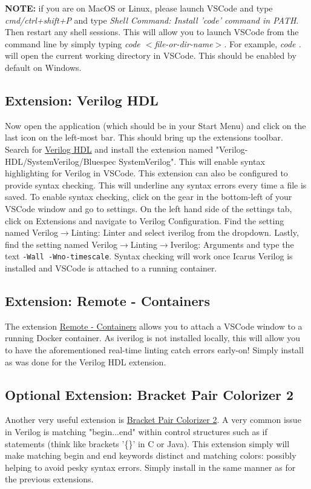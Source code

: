 \documentclass[11pt, letterpaper, titlepage, oneside]{memoir}
\begin{document}
        \textbf{NOTE:} if you are on MacOS or Linux, please launch VSCode and type \textit{cmd/ctrl+shift+P} and type \textit{Shell Command: Install 'code' command in PATH}. Then restart any shell sessions. This will allow you to launch VSCode from the command line by simply typing \textit{code $<$file-or-dir-name$>$}. For example, \textit{code .} will open the current working directory in VSCode. This should be enabled by default on Windows.

        \subsection*{Extension: Verilog HDL}
            Now open the application (which should be in your Start Menu) and click on the last icon on the left-most bar. This should bring up the extensions toolbar. Search for \href{https://marketplace.visualstudio.com/items?itemName=mshr-h.VerilogHDL}{Verilog HDL} and install the extension named "Verilog-HDL/SystemVerilog/Bluespec SystemVerilog". This will enable syntax highlighting for Verilog in VSCode. This extension can also be configured to provide syntax checking. This will underline any syntax errors every time a file is saved. To enable syntax checking, click on the gear in the bottom-left of your VSCode window and go to settings. On the left hand side of the settings tab, click on Extensions and navigate to Verilog Configuration. Find the setting named Verilog$\rightarrow$Linting: Linter and select iverilog from the dropdown. Lastly, find the setting named Verilog$\rightarrow$Linting$\rightarrow$Iverilog: Arguments and type the text \texttt{-Wall -Wno-timescale}. Syntax checking will work once Icarus Verilog is installed and VSCode is attached to a running container.

		\subsection*{Extension: Remote - Containers}
		    The extension \href{https://marketplace.visualstudio.com/items?itemName=ms-vscode-remote.remote-containers}{Remote - Containers} allows you to attach a VSCode window to a running Docker container. As iverilog is not installed locally, this will allow you to have the aforementioned real-time linting catch errors early-on! Simply install as was done for the Verilog HDL extension.
			
		\subsection*{Optional Extension: Bracket Pair Colorizer 2}
		    Another very useful extension is \href{https://marketplace.visualstudio.com/items?itemName=CoenraadS.bracket-pair-colorizer-2}{Bracket Pair Colorizer 2}. A very common issue in Verilog is matching "begin...end" within control structures such as if statements (think like brackets '\{\}' in C or Java). This extension simply will make matching begin and end keywords distinct and matching colors: possibly helping to avoid pesky syntax errors. Simply install in the same manner as for the previous extensions.
	    
\end{document}
